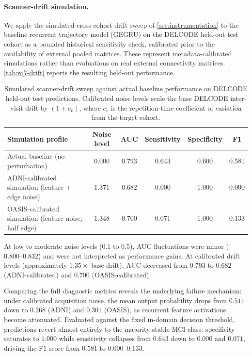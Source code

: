 \paragraph{Scanner-drift simulation.} We apply the simulated cross-cohort drift sweep of \autoref{sec:instrumentation} to the baseline recurrent trajectory model (\ac{GEGRU}) on the \ac{DELCODE} held-out test cohort as a bounded historical sensitivity check, calibrated prior to the availability of external pooled matrices. These represent metadata-calibrated simulations rather than evaluations on real external connectivity matrices. \autoref{tab:rq7-drift} reports the resulting held-out performance.

\begin{table}[htbp]
\centering
\small
\caption{Simulated scanner-drift sweep against actual baseline performance on \ac{DELCODE} held-out test predictions. Calibrated noise levels scale the base \ac{DELCODE} inter-visit drift by $(1+c_v)$, where $c_v$ is the repetition-time coefficient of variation from the target cohort.}
\label{tab:rq7-drift}
\begin{tabularx}{\textwidth}{@{}Xccccc@{}}
\toprule
Simulation profile & Noise level & \ac{AUC} & Sensitivity & Specificity & F1 \\
\midrule
Actual baseline (no perturbation) & 0.000 & 0.793 & 0.643 & 0.600 & 0.581 \\
\ac{ADNI}-calibrated simulation (feature $+$ edge noise) & 1.371 & 0.682 & 0.000 & 1.000 & 0.000 \\
\ac{OASIS}-calibrated simulation (feature noise, half edge) & 1.348 & 0.700 & 0.071 & 1.000 & 0.133 \\
\bottomrule
\end{tabularx}
\end{table}

At low to moderate noise levels ($0.1$ to $0.5$), \ac{AUC} fluctuations were minor ($0.800\text{--}0.832$) and were not interpreted as performance gains. At calibrated drift levels (approximately $1.35\times$ base drift), \ac{AUC} decreased from $0.793$ to $0.682$ (\ac{ADNI}-calibrated) and $0.700$ (\ac{OASIS}-calibrated). 

Comparing the full diagnostic metrics reveals the underlying failure mechanism: under calibrated acquisition noise, the mean output probability drops from $0.511$ down to $0.268$ (\ac{ADNI}) and $0.301$ (\ac{OASIS}), as recurrent feature activations become attenuated. Evaluated against the fixed in-domain decision threshold, predictions revert almost entirely to the majority stable-\ac{MCI} class: specificity saturates to $1.000$ while sensitivity collapses from $0.643$ down to $0.000$ and $0.071$, driving the F1 score from $0.581$ to $0.000\text{--}0.133$.

